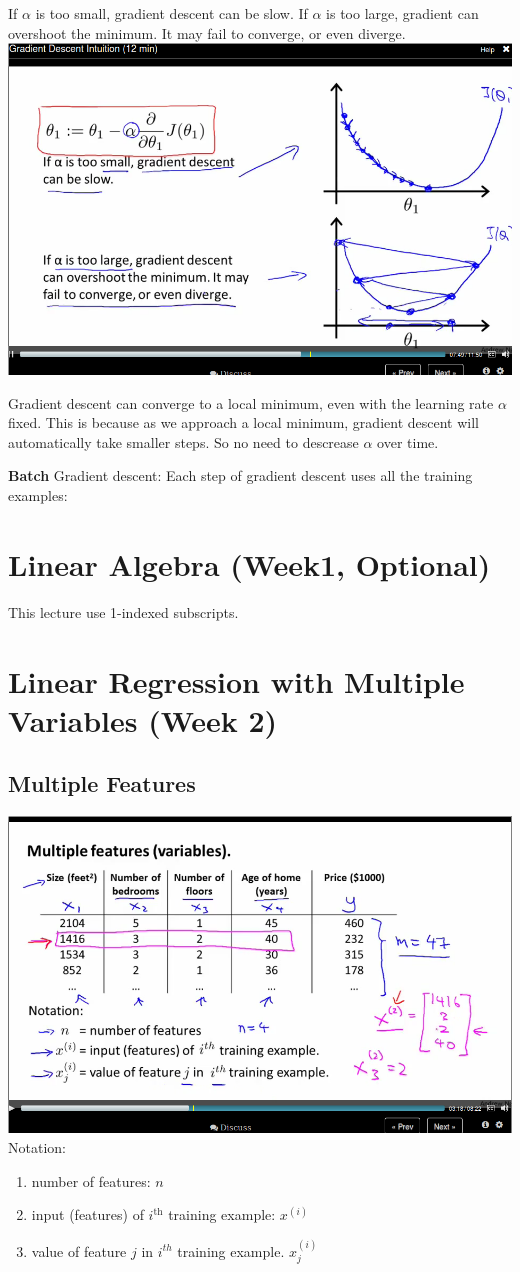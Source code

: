 \documentclass[11pt]{article}
\begin{document}
If $\alpha$ is too small, gradient descent can be slow. If $\alpha$ is too large, gradient can overshoot the minimum. It may fail to converge, or even diverge.
\includegraphics[width=.9\linewidth]{./images/screenshot-12.png}


Gradient descent can converge to a local minimum, even with the learning rate $\alpha$ fixed. This is because as we approach a local minimum, gradient descent will automatically take smaller steps. So no need to descrease $\alpha$ over time.


\textbf{Batch} Gradient descent:
Each step of gradient descent uses all the training examples:
\section*{Linear Algebra (Week1, Optional)}
\label{sec-4}
This lecture use 1-indexed subscripts.
\section*{Linear Regression with Multiple Variables (Week 2)}
\label{sec-5}
\subsection*{Multiple Features}
\label{sec-5-1}
\includegraphics[width=.9\linewidth]{./images/screenshot-13.png}
Notation:
\begin{enumerate}
\item number of features: \(n\)
\item input (features) of \(i^{\text{th}}\) training example: \(x^{(i)}\)
\item value of feature \(j\) in \(i^{th}\) training example. \(x^{(i)}_{j}\)
\end{enumerate}
\end{document}
